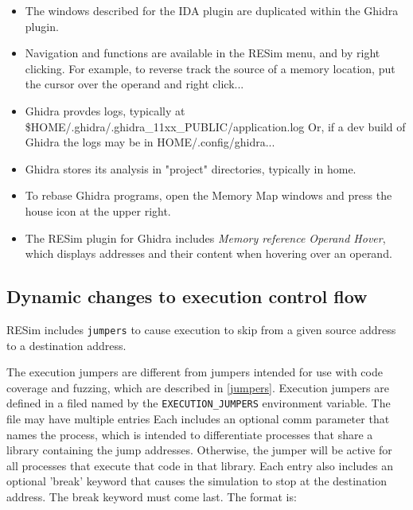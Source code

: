\documentclass[titlepage]{article}
\begin{document}
\begin{itemize}
\item The windows described for the IDA plugin are duplicated within the Ghidra plugin.

\item Navigation and functions are available in the RESim menu, and by right clicking.  For example, to reverse track
the source of a memory location, put the cursor over the operand and right click...

\item Ghidra provdes logs, typically at \$HOME/.ghidra/.ghidra\_11xx\_PUBLIC/application.log
Or, if a dev build of Ghidra the logs may be in HOME/.config/ghidra...

\item Ghidra stores its analysis in "project" directories, typically in home.

\item To rebase Ghidra programs, open the Memory Map windows and press the house icon at the upper right.

\item The RESim plugin for Ghidra includes \textit{Memory reference Operand Hover}, which displays addresses
and their content when hovering over an operand.


\end{itemize}

\subsection{Dynamic changes to execution control flow}
\label{dynamic_control_flow}
RESim includes {\tt jumpers} to cause execution to skip from a given source address to a destination address.

The execution jumpers are different from jumpers intended for use with code coverage and fuzzing,
which are described in \ref{jumpers}.
Execution jumpers are defined in a filed named by the {\tt EXECUTION\_JUMPERS} environment variable.
The file may have multiple entries
Each includes an optional comm parameter that names the process,
which is intended to differentiate processes that share a library containing the jump 
addresses. Otherwise, the jumper will be active for all processes that execute that code
in that library. Each entry also includes an optional 'break' keyword that causes the
simulation to stop at the destination address. The break keyword must come last.
The format is:
\end{document}

